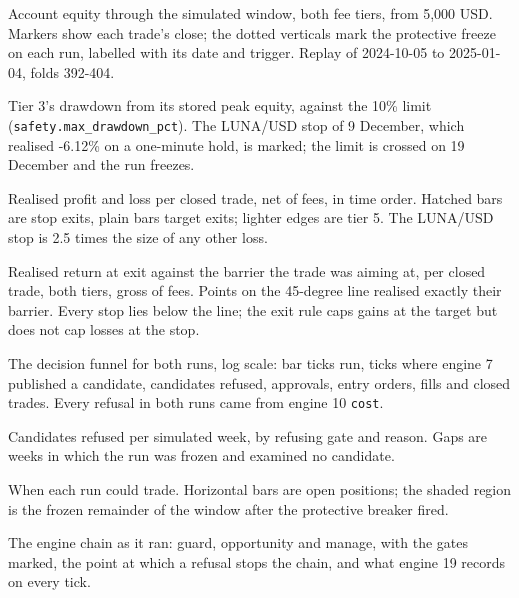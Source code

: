 \caption{Account equity through the simulated window, both fee tiers, from 5,000 USD. Markers show each trade's close; the dotted verticals mark the protective freeze on each run, labelled with its date and trigger. Replay of 2024-10-05 to 2025-01-04, folds 392-404.}

\caption{Tier 3's drawdown from its stored peak equity, against the 10\% limit (\texttt{safety.max\_drawdown\_pct}). The LUNA/USD stop of 9 December, which realised -6.12\% on a one-minute hold, is marked; the limit is crossed on 19 December and the run freezes.}

\caption{Realised profit and loss per closed trade, net of fees, in time order. Hatched bars are stop exits, plain bars target exits; lighter edges are tier 5. The LUNA/USD stop is 2.5 times the size of any other loss.}

\caption{Realised return at exit against the barrier the trade was aiming at, per closed trade, both tiers, gross of fees. Points on the 45-degree line realised exactly their barrier. Every stop lies below the line; the exit rule caps gains at the target but does not cap losses at the stop.}

\caption{The decision funnel for both runs, log scale: bar ticks run, ticks where engine 7 published a candidate, candidates refused, approvals, entry orders, fills and closed trades. Every refusal in both runs came from engine 10 \texttt{cost}.}

\caption{Candidates refused per simulated week, by refusing gate and reason. Gaps are weeks in which the run was frozen and examined no candidate.}

\caption{When each run could trade. Horizontal bars are open positions; the shaded region is the frozen remainder of the window after the protective breaker fired.}

\caption{The engine chain as it ran: guard, opportunity and manage, with the gates marked, the point at which a refusal stops the chain, and what engine 19 records on every tick.}

